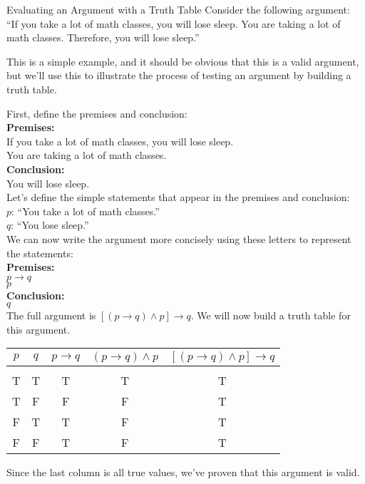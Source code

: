 \begin{example}[https://www.youtube.com/watch?v=IWk35nPpq3g]{Evaluating an Argument with a Truth Table}
Consider the following argument:\\
``If you take a lot of math classes, you will lose sleep.  You are taking a lot of math classes.  Therefore, you will lose sleep.''

\sol
This is a simple example, and it should be obvious that this is a valid argument, but we'll use this to illustrate the process of testing an argument by building a truth table.

First, define the premises and conclusion:\\

\textbf{Premises:}\\
If you take a lot of math classes, you will lose sleep.\\
You are taking a lot of math classes.\\

\textbf{Conclusion:}\\
You will lose sleep.\\

Let's define the simple statements that appear in the premises and conclusion:\\
$p$: ``You take a lot of math classes.''\\
$q$: ``You lose sleep.''\\

We can now write the argument more concisely using these letters to represent the statements:\\

\textbf{Premises:}\\
$p \to q$\\
$p$\\

\textbf{Conclusion:}\\
$q$\\

The full argument is $[(p \to q) \wedge p] \to q$.  We will now build a truth table for this argument.
\begin{center}
\begin{tabular}{|c c c c c|}
\hline
$p$ & $q$ & $p \to q$ & $(p \to q) \wedge p$ & $[(p \to q) \wedge p] \to q$\\
\hline
& & & & \\
T & T & T & T & T\\
T & F & F & F & T\\
F & T & T & F & T\\
F & F & T & F & T\\
\hline
\end{tabular}
\end{center}
Since the last column is all true values, we've proven that this argument is valid.
\end{example}


